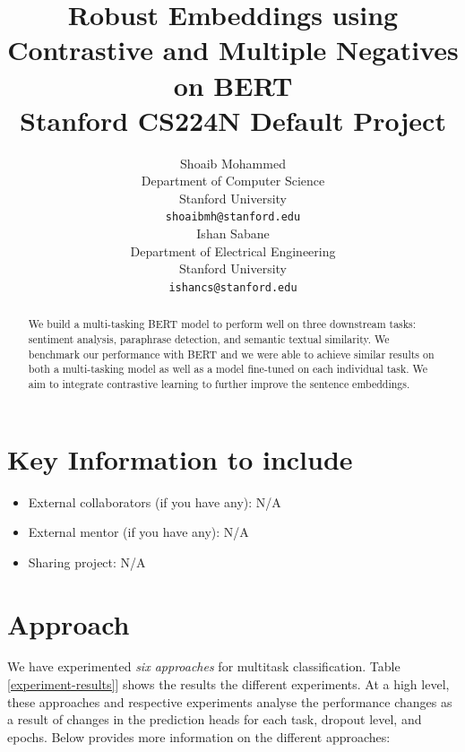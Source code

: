 \documentclass{article}
\title{
  Robust Embeddings using Contrastive and Multiple
Negatives on BERT \\
  \vspace{1em}
  \small{\normalfont Stanford CS224N Default Project}  %
}
\author{
  Shoaib Mohammed \\
  Department of Computer Science \\
  Stanford University \\
  \texttt{shoaibmh@stanford.edu} \\
  \And
  Ishan Sabane \\
  Department of Electrical Engineering \\
  Stanford University \\
  \texttt{ishancs@stanford.edu} \\
}
\begin{document}
\maketitle

\begin{abstract}
    We build a multi-tasking BERT model to perform well on three downstream tasks: sentiment analysis, paraphrase detection, and semantic textual similarity. We benchmark our performance with BERT and we were able to achieve similar results on both a multi-tasking model as well as a model fine-tuned on each individual task. We aim to integrate contrastive learning to further improve the sentence embeddings.
\end{abstract}


\section{Key Information to include}
\begin{itemize}
    \item External collaborators (if you have any): N/A
    \item External mentor (if you have any): N/A
    \item Sharing project: N/A
\end{itemize}

\section{Approach}

We have experimented \textit{six approaches} for multitask classification. Table \ref{experiment-results}] shows the results the different experiments. At a high level, these approaches and respective experiments analyse the performance changes as a result of changes in the prediction heads for each task, dropout level, and epochs. Below provides more information on the different approaches:
\end{document}
